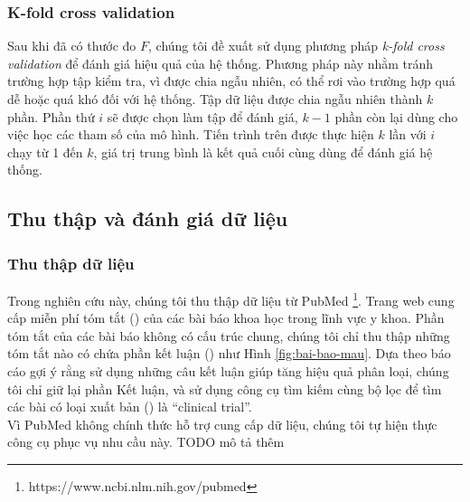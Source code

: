 \subsubsection*{K-fold cross validation}
Sau khi đã có thước đo \(F\), chúng tôi đề xuất sử dụng phương pháp \textit{k-fold cross validation} để đánh giá hiệu quả của hệ thống. Phương pháp này nhằm tránh trường hợp tập kiểm tra, vì được chia ngẫu nhiên, có thể rơi vào trường hợp quá dễ hoặc quá khó đối với hệ thống. Tập dữ liệu được chia ngẫu nhiên thành \(k\) phần. Phần thứ \(i\) sẽ được chọn làm tập để đánh giá, \(k-1\) phần còn lại dùng cho việc học các tham số của mô hình. Tiến trình trên được thực hiện \(k\) lần với \(i\) chạy từ 1 đến \(k\), giá trị trung bình là kết quả cuối cùng dùng để đánh giá hệ thống.

\subsection{Thu thập và đánh giá dữ liệu} \label{sec:thu-thap-va-danh-gia-du-lieu}
\subsubsection*{Thu thập dữ liệu}
Trong nghiên cứu này, chúng tôi thu thập dữ liệu từ  PubMed \footnote{https://www.ncbi.nlm.nih.gov/pubmed}. Trang web cung cấp miễn phí tóm tắt () của các bài báo khoa học trong lĩnh vực y khoa. Phần tóm tắt của các bài báo không có cấu trúc chung, chúng tôi chỉ thu thập những tóm tắt nào có chứa phần kết luận () như Hình \ref{fig:bai-bao-mau}. Dựa theo báo cáo \cite{sarker2011outcome} gợi ý rằng sử dụng những câu kết luận giúp tăng hiệu quả phân loại, chúng tôi chỉ giữ lại phần Kết luận, và sử dụng công cụ tìm kiếm cùng bộ lọc để tìm các bài có loại xuất bản () là ``clinical trial''.\\

Vì  PubMed không chính thức hỗ trợ cung cấp dữ liệu, chúng tôi tự hiện thực công cụ phục vụ nhu cầu này. TODO mô tả thêm\\

